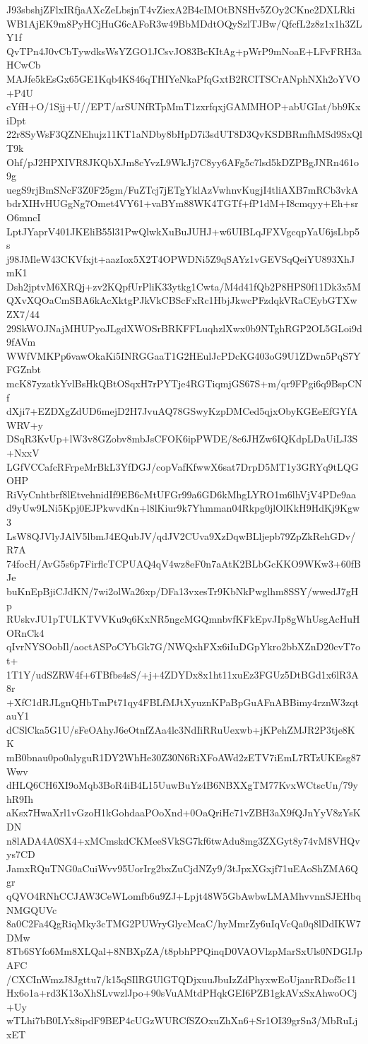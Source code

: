 J93sbshjZFlxIRfjaAXcZeLbsjnT4vZiexA2B4cIMOtBNSHv5ZOy2CKne2DXLRki
WB1AjEK9m8PyHCjHuG6cAFoR3w49BbMDdtOQySzlTJBw/QfcfL2z8z1x1h3ZLY1f
QvTPn4J0vCbTywdksWsYZGO1JCsvJO83BcKItAg+pWrP9mNoaE+LFvFRH3aHCwCb
MAJfe5kEsGx65GE1Kqb4KS46qTHIYeNkaPfqGxtB2RCITSCrANphNXh2oYVO+P4U
cYfH+O/1Sjj+U//EPT/arSUNfRTpMmT1zxrfqxjGAMMHOP+abUGIat/bb9KxiDpt
22r8SyWsF3QZNEhujz11KT1aNDby8bHpD7i3sdUT8D3QvKSDBRmfhMSd9SxQlT9k
Ohf/pJ2HPXIVR8JKQbXJm8cYvzL9WkJj7C8yy6AFg5c7lsd5kDZPBgJNRn461o9g
uegS9rjBmSNcF3Z0F25gm/FuZTcj7jETgYklAzVwhnvKugjI4tliAXB7mRCb3vkA
bdrXIHvHUGgNg7Omet4VY61+vaBYm88WK4TGTf+fP1dM+I8cmqyy+Eh+srO6mncI
LptJYaprV401JKEliB55l31PwQlwkXuBuJUHJ+w6UIBLqJFXVgcqpYaU6jsLbp5s
j98JMleW43CKVfxjt+aazIox5X2T4OPWDNi5Z9qSAYz1vGEVSqQeiYU893XhJmK1
Dsh2jptvM6XRQj+zv2KQpfUrPliK33ytkg1Cwta/M4d41fQb2P8HPS0f11Dk3x5M
QXvXQOaCmSBA6kAcXktgPJkVkCBScFxRc1HbjJkwcPFzdqkVRaCEybGTXwZX7/44
29SkWOJNajMHUPyoJLgdXWOSrBRKFFLuqhzlXwx0b9NTghRGP2OL5GLoi9d9fAVm
WWfVMKPp6vawOkaKi5INRGGaaT1G2HEulJcPDcKG403oG9U1ZDwn5PqS7YFGZnbt
mcK87yzatkYvlBsHkQBtOSqxH7rPYTje4RGTiqmjGS67S+m/qr9FPgi6q9BspCNf
dXji7+EZDXgZdUD6mejD2H7JvuAQ78GSwyKzpDMCed5qjxObyKGEeEfGYfAWRV+y
DSqR3KvUp+lW3v8GZobv8mbJsCFOK6ipPWDE/8c6JHZw6IQKdpLDaUiLJ3S+NxxV
LGfVCCafcRFrpeMrBkL3YfDGJ/copVafKfwwX6sat7DrpD5MT1y3GRYq9tLQGOHP
RiVyCnhtbrf8lEtvehnidIf9EB6cMtUFGr99a6GD6kMhgLYRO1m6lhVjV4PDe9aa
d9yUw9LNi5Kpj0EJPkwvdKn+l8lKiur9k7Yhmman04Rkpg0jlOlKkH9HdKj9Kgw3
LsW8QJVlyJAlV5lbmJ4EQubJV/qdJV2CUva9XzDqwBLljepb79ZpZkRehGDv/R7A
74focH/AvG5s6p7FirflcTCPUAQ4qV4wz8eF0n7aAtK2BLbGcKKO9WKw3+60fBJe
buKnEpBjiCJdKN/7wi2olWa26xp/DFa13vxesTr9KbNkPwglhm8SSY/wwedJ7gHp
RUskvJU1pTULKTVVKu9q6KxNR5ngcMGQmnbvfKFkEpvJIp8gWhUsgAcHuHORnCk4
qIvrNYSOobIl/aoctASPoCYbGk7G/NWQxhFXx6iIuDGpYkro2bbXZnD20cvT7ot+
1T1Y/udSZRW4f+6TBfbs4sS/+j+4ZDYDx8x1ht11xuEz3FGUz5DtBGd1x6lR3A8r
+XfC1dRJLgnQHbTmPt71qy4FBLfMJtXyuznKPaBpGuAFnABBimy4rznW3zqtauY1
dCSlCka5G1U/sFeOAhyJ6eOtnfZAa4lc3NdIiRRuUexwb+jKPehZMJR2P3tje8KK
mB0bnau0po0alyguR1DY2WhHe30Z30N6RiXFoAWd2zETV7iEmL7RTzUKEsg87Wwv
dHLQ6CH6XI9oMqb3BoR4iB4L15UuwBuYz4B6NBXXgTM77KvxWCtscUn/79yhR9Ih
aKsx7HwaXrl1vGzoH1kGohdaaPOoXnd+0OaQriHc71vZBH3aX9fQJnYyV8zYsKDN
n8lADA4A0SX4+xMCmskdCKMeeSVkSG7kf6twAdu8mg3ZXGyt8y74vM8VHQvys7CD
JamxRQuTNG0aCuiWvv95UorIrg2bxZuCjdNZy9/3tJpxXGxjf71uEAoShZMA6Qgr
qQVO4RNhCCJAW3CeWLomfb6u9ZJ+Lpjt48W5GbAwbwLMAMhvvnnSJEHbqNMGQUVc
8a0C2Fa4QgRiqMky3cTMG2PUWryGlycMcaC/hyMmrZy6uIqVcQa0q8lDdIKW7DMw
8Tb6SYfo6Mm8XLQal+8NBXpZA/t8pbhPPQinqD0VAOVlzpMarSxUls0NDGIJpAFC
/CXCInWmzJ8Jgttu7/k15qSIlRGUlGTQDjxuuJbuIzZdPhyxwEoUjanrRDof5c11
Hx6o1a+rd3K13oXhSLvwzlJpo+90sVuAMtdPHqkGEI6PZB1gkAVxSxAhwoOCj+Uy
wTLhi7bB0LYx8ipdF9BEP4cUGzWURCfSZOxuZhXn6+Sr1OI39grSn3/MbRuLjxET
